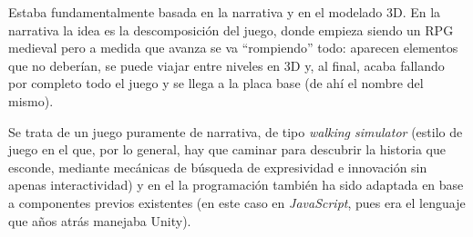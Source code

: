 Estaba fundamentalmente basada en la narrativa y en el modelado 3D. En la narrativa la idea es la descomposición del juego, donde empieza siendo un RPG medieval pero a medida que avanza se va ``rompiendo'' todo: aparecen elementos que no deberían, se puede viajar entre niveles en 3D y, al final, acaba fallando por completo todo el juego y se llega a la placa base (de ahí el nombre del mismo). 

Se trata de un juego puramente de narrativa, de tipo \textit{walking simulator} (estilo de juego en el que, por lo general, hay que caminar para descubrir la historia que esconde, mediante mecánicas de búsqueda de expresividad e innovación sin apenas interactividad) y en el la programación también ha sido adaptada en base a componentes previos existentes (en este caso en \textit{JavaScript}, pues era el lenguaje que años atrás manejaba Unity). 